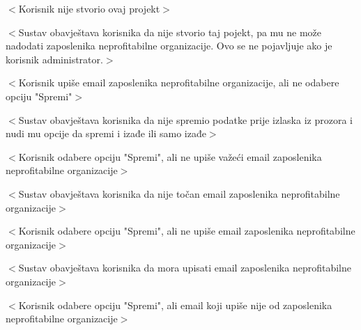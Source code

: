 \begin{packed_item}
\begin{packed_item}
							\item[7.a] $<$Korisnik nije stvorio ovaj projekt$>$
							\item[] \begin{packed_enum}

								\item $<$Sustav obavještava korisnika da nije stvorio taj pojekt, pa mu ne može nadodati
								zaposlenika neprofitabilne organizacije. Ovo se ne pojavljuje ako je korisnik administrator.$>$

							\end{packed_enum}

							\item[9.a] $<$Korisnik upiše email zaposlenika neprofitabilne organizacije, ali ne odabere opciju "Spremi"$>$
							\item[] \begin{packed_enum}

								\item $<$Sustav obavještava korisnika da nije spremio podatke prije izlaska
								iz prozora i nudi mu opcije da spremi i izađe ili samo izađe$>$

							\end{packed_enum}

							\item[9.b] $<$Korisnik odabere opciju "Spremi", ali ne upiše važeći email zaposlenika neprofitabilne organizacije$>$
							\item[] \begin{packed_enum}

								\item $<$Sustav obavještava korisnika da nije točan email zaposlenika neprofitabilne organizacije$>$

							\end{packed_enum}

							\item[9.c] $<$Korisnik odabere opciju "Spremi", ali ne upiše email zaposlenika neprofitabilne organizacije$>$
							\item[] \begin{packed_enum}

								\item $<$Sustav obavještava korisnika da mora upisati email zaposlenika neprofitabilne organizacije$>$

							\end{packed_enum}

							\item[9.d] $<$Korisnik odabere opciju "Spremi", ali email koji upiše nije od zaposlenika neprofitabilne organizacije$>$
							\item[] \begin{packed_enum}


\end{packed_enum}
\end{packed_item}
\end{packed_item}
